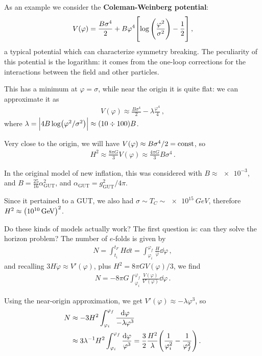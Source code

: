 \documentclass[main.tex]{subfiles}
\begin{document}
As an example we consider the \textbf{Coleman-Weinberg potential}: 
%
\begin{align}
V(\varphi ) = \frac{B \sigma^{4}}{2}
+ B \varphi^{4} \qty[\log \qty(\frac{\varphi^2}{\sigma^2}) - \frac{1}{2}]
\,,
\end{align}
%
a typical potential which can characterize symmetry breaking. 
The peculiarity of this potential is the logarithm: it comes from the one-loop corrections for the interactions between the field and other particles. 

This has a minimum at \(\varphi = \sigma \), while near the origin it is quite flat: we can approximate it as 
%
\begin{align}
V(\varphi ) \approx \frac{B \sigma^{4}}{2} - \lambda \frac{\varphi^{4}}{4} 
\,,
\end{align}
%
where \(\lambda = \abs{4 B \log (\varphi^2 / \sigma^2)} \approx \qty(\num{10} \divisionsymbol \num{100}) B\). 

Very close to the origin, we will have \(V(\varphi ) \approx B \sigma^{4} / 2 = \text{const}\), so 
%
\begin{align}
H^2 \approx \frac{8 \pi G}{3} V(\varphi ) \approx \frac{4 \pi G}{3} B \sigma^{4}
\,.
\end{align}

In the original model of new inflation, this was considered with \(B \approx \num{e-3}\), and \(B = \frac{25}{16} \alpha^2 _{\text{GUT}}\), and \(\alpha _{\text{GUT}} = g _{\text{GUT}}^2 / 4 \pi \). 

Since it pertained to a GUT, we also had \(\sigma \sim T_C \sim \SI{e15}{GeV}\), therefore \(H^2 \approx \qty(\SI{e10}{GeV})^2\). 

Do these kinds of models actually work? The first question is: can they solve the horizon problem? The number of \(e\)-folds is given by 
%
\begin{align}
N = \int _{t_i}^{t_F} H \dd{t} = \int_{\varphi _i}^{\varphi _f} \frac{H}{\dot{\varphi}} \dd{\varphi }
\,,
\end{align}
%
and recalling \(3 H \dot{\varphi} \approx V' (\varphi )\), plus \(H^2= 8 \pi G V(\varphi ) /3\), we find 
%
\begin{align}
N = - 8 \pi G \int_{\varphi _i}^{\varphi _f} \frac{V(\varphi )}{V'(\varphi )} \dd{\varphi }
\,.
\end{align}

Using the near-origin approximation, we get \(V'(\varphi ) \approx - \lambda \varphi^3\), so 
%
\begin{align}
N &\approx  - 3 H^2 \int_{\varphi _i}^{\varphi _f} \frac{ \dd{\varphi }}{- \lambda \varphi^3}   \\
&\approx 3 \lambda^{-1} H^2 \int_{\varphi _i}^{\varphi _f} \frac{ \dd{\varphi }}{\varphi^3} = \frac{3}{2} \frac{H^2}{\lambda } \qty( \frac{1}{\varphi _i^2} - \frac{1}{\varphi_f^2})
\,.
\end{align}
\end{document}

